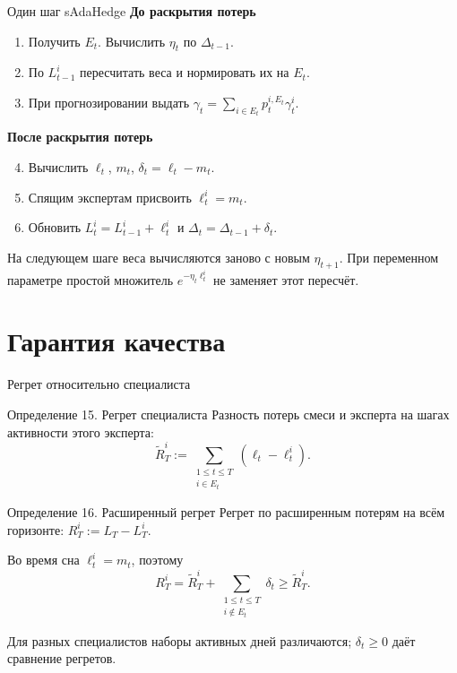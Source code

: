 \documentclass[11pt,aspectratio=169]{beamer}
\begin{document}
\begin{frame}{Один шаг sAdaHedge}
  \textbf{До раскрытия потерь}
  \begin{enumerate}
    \item Получить $E_t$. Вычислить $\eta_t$ по $\Delta_{t-1}$.
    \item По $L_{t-1}^i$ пересчитать веса и нормировать их на $E_t$.
    \item При прогнозировании выдать $\displaystyle\gamma_t=\sum_{i\in E_t} p_t^{i,E_t}\gamma_t^i$.
  \end{enumerate}
  \medskip
  \textbf{После раскрытия потерь}
  \begin{enumerate}
    \setcounter{enumi}{3}
    \item Вычислить $\ell_t$, $m_t$, $\delta_t=\ell_t-m_t$.
    \item Спящим экспертам присвоить $\ell_t^i=m_t$.
    \item Обновить $L_t^i=L_{t-1}^i+\ell_t^i$ и $\Delta_t=\Delta_{t-1}+\delta_t$.
  \end{enumerate}
  \par\vfill{\scriptsize На следующем шаге веса вычисляются заново с новым $\eta_{t+1}$. При переменном параметре простой множитель $e^{-\eta_t\ell_t^i}$ не заменяет этот пересчёт.\par}
\end{frame}

\section{Гарантия качества}
\begin{frame}{Регрет относительно специалиста}
  \begin{block}{Определение 15. Регрет специалиста}
    Разность потерь смеси и эксперта на шагах активности этого эксперта:
    \[
      \widetilde R_T^i:=
         \sum_{\substack{1\le t\le T\\i\in E_t}}(\ell_t-\ell_t^i).
    \]
  \end{block}
  \begin{block}{Определение 16. Расширенный регрет}
    Регрет по расширенным потерям на всём горизонте:
    $R_T^i:=L_T-L_T^i$.
  \end{block}
  Во время сна $\ell_t^i=m_t$, поэтому
  \[
    R_T^i=\widetilde R_T^i+
       \sum_{\substack{1\le t\le T\\i\notin E_t}}\delta_t
       \ge\widetilde R_T^i.
  \]
  \par\vfill{\scriptsize Для разных специалистов наборы активных дней различаются; $\delta_t\ge0$ даёт сравнение регретов.\par}
\end{frame}
\end{document}
